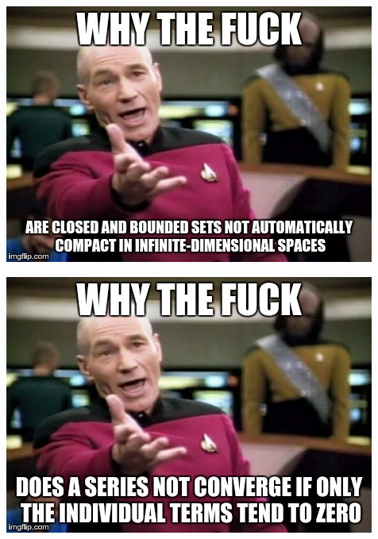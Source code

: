 \documentclass[a4paper,ngerman,landscape,30pt]{scrartcl}
\begin{document}
\begin{center}
  \includegraphics[scale=1.4]{picard-compact}
\end{center}
\newpage

\begin{center}
  \includegraphics[scale=1.4]{picard-series}
\end{center}
\end{document}
